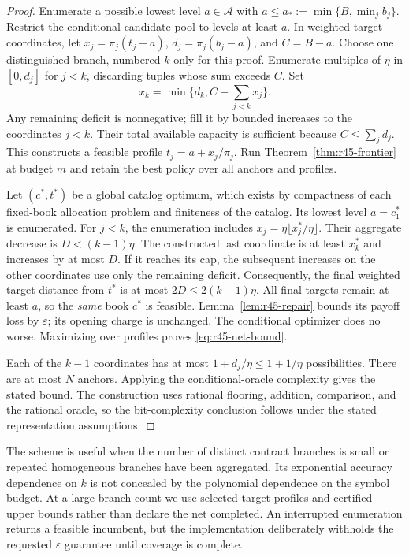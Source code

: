 \begin{proof}
Enumerate a possible lowest level $a\in\mathcal A$ with $a\leq a_*:=\min\{B,\min_jb_j\}$. Restrict the conditional candidate pool to levels at least $a$. In weighted target coordinates, let $x_j=\pi_j(t_j-a)$, $d_j=\pi_j(b_j-a)$, and $C=B-a$. Choose one distinguished branch, numbered $k$ only for this proof. Enumerate multiples of $\eta$ in $[0,d_j]$ for $j<k$, discarding tuples whose sum exceeds $C$. Set
\[
 x_k=\min\{d_k,C-\textstyle\sum_{j<k}x_j\}.
\]
Any remaining deficit is nonnegative; fill it by bounded increases to the coordinates $j<k$. Their total available capacity is sufficient because $C\leq\sum_jd_j$. This constructs a feasible profile $t_j=a+x_j/\pi_j$. Run Theorem~\ref{thm:r45-frontier} at budget $m$ and retain the best policy over all anchors and profiles.

Let $(c^*,t^*)$ be a global catalog optimum, which exists by compactness of each fixed-book allocation problem and finiteness of the catalog. Its lowest level $a=c^*_1$ is enumerated. For $j<k$, the enumeration includes $x_j=\eta\lfloor x_j^*/\eta\rfloor$. Their aggregate decrease is $D< (k-1)\eta$. The constructed last coordinate is at least $x_k^*$ and increases by at most $D$. If it reaches its cap, the subsequent increases on the other coordinates use only the remaining deficit. Consequently, the final weighted target distance from $t^*$ is at most $2D\leq2(k-1)\eta$. All final targets remain at least $a$, so the \emph{same} book $c^*$ is feasible. Lemma~\ref{lem:r45-repair} bounds its payoff loss by $\varepsilon$; its opening charge is unchanged. The conditional optimizer does no worse. Maximizing over profiles proves \eqref{eq:r45-net-bound}.

Each of the $k-1$ coordinates has at most $1+d_j/\eta\leq1+1/\eta$ possibilities. There are at most $N$ anchors. Applying the conditional-oracle complexity gives the stated bound. The construction uses rational flooring, addition, comparison, and the rational oracle, so the bit-complexity conclusion follows under the stated representation assumptions.
\end{proof}

The scheme is useful when the number of distinct contract branches is small or repeated homogeneous branches have been aggregated. Its exponential accuracy dependence on $k$ is not concealed by the polynomial dependence on the symbol budget. At a large branch count we use selected target profiles and certified upper bounds rather than declare the net completed. An interrupted enumeration returns a feasible incumbent, but the implementation deliberately withholds the requested $\varepsilon$ guarantee until coverage is complete.

